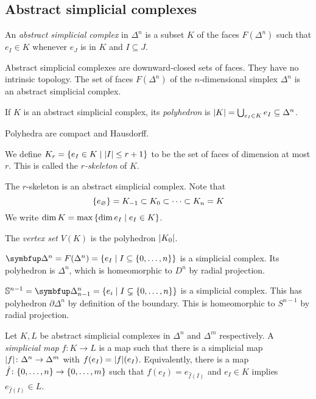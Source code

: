 \subsection{Abstract simplicial complexes}
\begin{definition}
	An \emph{abstract simplicial complex} in \( \Delta^n \) is a subset \( K \) of the faces \( F(\Delta^n) \) such that \( e_I \in K \) whenever \( e_J \) is in \( K \) and \( I \subseteq J \).
\end{definition}
\begin{remark}
	Abstract simplicial complexes are downward-closed sets of faces.
	They have no intrinsic topology.
	The set of faces \( F(\Delta^n) \) of the \( n \)-dimensional simplex \( \Delta^n \) is an abstract simplicial complex.
\end{remark}
\begin{definition}
	If \( K \) is an abstract simplicial complex, its \emph{polyhedron} is \( \abs{K} = \bigcup_{e_I \in K} e_I \subseteq \Delta^n \).
\end{definition}
\begin{remark}
	Polyhedra are compact and Hausdorff.
\end{remark}
\begin{definition}
	We define \( K_r = \qty{e_I \in K \mid \abs{I} \leq r + 1} \) to be the set of faces of dimension at most \( r \).
	This is called the \emph{\( r \)-skeleton} of \( K \).
\end{definition}
The \( r \)-skeleton is an abstract simplicial complex.
Note that
\[ \qty{e_\varnothing} = K_{-1} \subset K_0 \subset \dots \subset K_n = K \]
We write \( \dim K = \max\qty{\dim e_I \mid e_I \in K} \).
\begin{definition}
	The \emph{vertex set} \( V(K) \) is the polyhedron \( \abs{K_0} \).
\end{definition}
\begin{example}
	\( \bm \Delta^n = F(\Delta^n) = \qty{e_I \mid I \subseteq \qty{0, \dots, n}} \) is a simplicial complex.
	Its polyhedron is \( \Delta^n \), which is homeomorphic to \( D^n \) by radial projection.
\end{example}
\begin{example}
	\( \mathbb S^{n-1} = \bm \Delta_{n-1}^n = \qty{e_i \mid I \subsetneq \qty{0, \dots, n}} \) is a simplicial complex.
	This has polyhedron \( \partial \Delta^n \) by definition of the boundary.
	This is homeomorphic to \( S^{n-1} \) by radial projection.
\end{example}
\begin{definition}
	Let \( K, L \) be abstract simplicial complexes in \( \Delta^n \) and \( \Delta^m \) respectively.
	A \emph{simplicial map} \( f \colon K \to L \) is a map such that there is a simplicial map \( \abs{f} \colon \Delta^n \to \Delta^m \) with \( f(e_I) = \abs{f}(e_I) \).
	Equivalently, there is a map \( \hat f \colon \qty{0, \dots, n} \to \qty{0, \dots, m} \) such that \( f(e_I) = e_{\hat f(I)} \) and \( e_I \in K \) implies \( e_{\hat f(I)} \in L \).
\end{definition}

